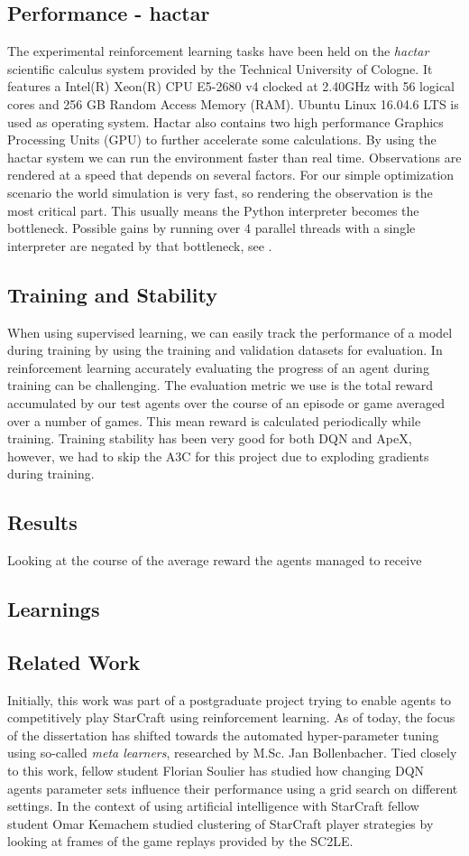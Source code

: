 \documentclass[12pt,a4paper]{article}
\begin{document}
\subsection{Performance - hactar}
The experimental reinforcement learning tasks have been held on the {\it hactar} scientific calculus system provided by the Technical University of Cologne. It features a Intel(R) Xeon(R) CPU E5-2680 v4 clocked at 2.40GHz with 56 logical cores and 256 GB Random Access Memory (RAM). Ubuntu Linux 16.04.6 LTS is used as operating system. Hactar also contains two high performance Graphics Processing Units (GPU) to further accelerate some calculations. By using the hactar system we can run the environment faster than real time. Observations are rendered at a speed that depends on several factors. For our simple optimization scenario the world simulation is very fast, so rendering the observation is the most critical part. This usually means the Python interpreter becomes the bottleneck. Possible gains by running over 4 parallel threads with a single interpreter are negated by that bottleneck, see \cite{DBLP:journals/corr/abs-1708-04782}.
\subsection{Training and Stability}
When using supervised learning, we can easily track the performance of a model during training by using the training and validation datasets for evaluation. In reinforcement learning accurately evaluating the progress of an agent during training can be challenging. The evaluation metric we use is the total reward accumulated by our test agents over the course of an episode or game averaged over a number of games. This mean reward is calculated periodically while training. Training stability has been very good for both DQN and ApeX, however, we had to skip the A3C for this project due to exploding gradients during training.
\subsection{Results}\label{sec:results}
Looking at the course of the average reward the agents managed to receive 
\subsection{Learnings}
\subsection{Related Work}
Initially, this work was part of a postgraduate project trying to enable agents to competitively play StarCraft using reinforcement learning. As of today, the focus of the dissertation has shifted towards the automated hyper-parameter tuning using so-called {\it meta learners}, researched by M.Sc. Jan Bollenbacher.
Tied closely to this work, fellow student Florian Soulier has studied how changing DQN agents parameter sets influence their performance using a grid search on different settings. In the context of using artificial intelligence with StarCraft fellow student Omar Kemachem studied clustering of StarCraft player strategies by looking at frames of the game replays provided by the SC2LE. 
\end{document}
